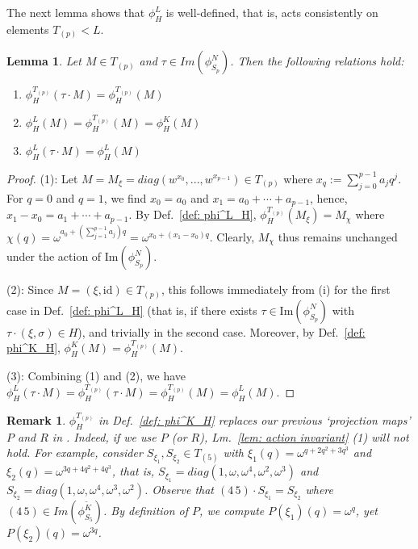 \documentclass[aps,pra,letterpaper,onrcolumn,nofootinbib,notitlepage,longbibliography]{revtex4-1}
\newtheorem{lemma}{Lemma}
\newtheorem{rmk}{Remark}
\newcommand{\mf}[1]{#1}
\newcommand{\id}{\mathrm{id}}
\begin{document}
The next lemma shows that $\phi^L_H$ is well-defined, that is, acts consistently on elements $T_{(p)}<L$.

\begin{lemma}{\label{lem: action invariant}}
    Let $M\in T_{(p)}$ and $\tau\in Im(\phi^N_{S_p})$. Then the following relations hold:
    \begin{enumerate}
        \item $\phi^{T_{(p)}}_H(\tau\cdot M)=\phi^{T_{(p)}}_H(M)$
        \item $\phi^L_H(M)=\phi^{T_{(p)}}_H(M)=\phi^K_H(M)$
        \item $\phi^L_H(\tau\cdot M)=\phi^L_H( M)$
    \end{enumerate}
\end{lemma}

\begin{proof}
    (1): Let $M=M_\xi=diag(w^{x_0},...,w^{x_{p-1}})\in T_{(p)}$ where \mf{$x_q:=\sum_{j=0}^{p-1} a_jq^j$}. For $q=0$ and $q=1$, we find $x_0=a_0$ and $x_1=a_0+\cdots+a_{p-1}$, hence, $x_1-x_0=a_1+\cdots+a_{p-1}$. By Def.~\ref{def: phi^L_H}, $\phi^{T_{(p)}}_H(M_\xi)=M_{\chi}$ \mf{where $\chi(q)=\omega^{a_0+\left(\sum_{j=1}^{p-1}a_j\right)q}=\omega^{x_0+(x_1-x_0)q}$}. Clearly, $M_\chi$ thus remains unchanged under the action of $\mathrm{Im}(\phi^N_{S_p})$.
    
    (2): Since $M=(\xi,\id)\in T_{(p)}$, this follows immediately from (i) for the first case in Def.~\ref{def: phi^L_H} (that is, if there exists $\tau\in \mathrm{Im}(\phi^N_{S_p})$ with $\tau\cdot(\xi,\sigma)\in H$), and trivially in the second case. \mf{Moreover, by Def.~\ref{def: phi^K_H}, $\phi^K_H(M)=\phi^{T_{(p)}}_H(M)$.}
    
    (3): Combining (1) and (2), we have $\phi^L_H(\tau\cdot M)=\phi^{T_{(p)}}_H(\tau\cdot M)=\phi^{T_{(p)}}_H(M)=\phi^L_H(M)$.
\end{proof}

\begin{rmk}
    $\phi^{T_{(p)}}_H$ in Def.~\ref{def: phi^K_H} replaces our previous `projection maps' $P$ and $R$ in \cite[Def.~2]{FrembsChungOkay2022}. Indeed, if we use $P$ (or $R$), Lm.~\ref{lem: action invariant} (1) will not hold. For example, consider $S_{\xi_1},S_{\xi_2}\in T_{(5)}$ with $\xi_1(q)=\omega^{q+2q^2+3q^3}$ and $\xi_2(q)=\omega^{3q+4q^2+4q^3}$, that is, $S_{\xi_1}=diag(1,\omega,\omega^4,\omega^2,\omega^3)$ and $S_{\xi_2}=diag(1,\omega,\omega^4,\omega^3,\omega^2)$. Observe that $(4\, 5)\cdot S_{\xi_1}=S_{\xi_2}$ where $(4\, 5)\in Im(\phi^{\tilde{K}}_{S_5})$. By definition of $P$, we compute $P(\xi_1)(q)=\omega^q$, yet $P(\xi_2)(q)=\omega^{3q}$.
\end{rmk}
\end{document}
